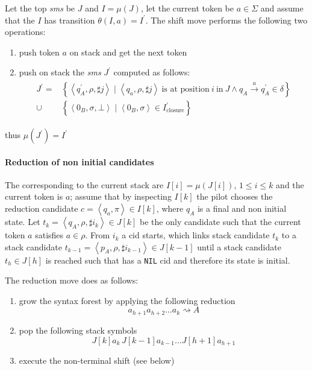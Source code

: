 \documentclass[english]{article}
\begin{document}
Let the top \textit{sms} be \(J\) and \(I = \mu(J)\), let the current token be \(a \in \Sigma\) and assume that the \mstate \(I\) has transition \(\theta(I, a) = I^\prime\). The shift move performs the following two operations:
\begin{enumerate}[label=\arabic*., ref=(\arabic*)]
  \item\label{enum:shift-move-1} push token \(a\) on stack and get the next token
  \item\label{enum:shift-move-2} push on stack the \textit{sms} \(J^\prime\) computed as follows:
  \begin{gather*}
    \begin{aligned}
      J^\prime  = & \left\{ \left\langle q_A^\prime, \rho, \sharp j \right\rangle \mid \left\langle q_a, \rho, \sharp j \right\rangle \ \text{is at position} \ i \ \text{in} \ J \land q_A \xrightarrow{a} q_A^\prime \in \delta \right\} \\
      \cup        & \left\{ \left\langle 0_B, \sigma, \bot \right\rangle \mid \left\langle 0_B, \sigma  \right\rangle \in I_{\text{closure}}^\prime \right\}
    \end{aligned}
  \end{gather*}
\end{enumerate}
thus \(\mu(J^\prime) = I^\prime\)

\paragraph*{Reduction of non initial candidates}

The \mstates corresponding to the current stack are \(I[i] = \mu\left( J[i] \right), \, 1 \leq i \leq k\) and the current token is \(a\);
assume that by inspecting \(I[k]\) the pilot chooses the reduction candidate \(c = \left\langle q_a, \pi \right\rangle \in I[k]\), where \(q_A\) is a final and non initial state.
Let \(t_k = \left\langle q_A, \rho, \sharp i_k \right\rangle \in J[k]\) be the only candidate such that the current token \(a\) satisfies \(a \in \rho\).
From \(i_k\) a cid starts, which links stack candidate \(t_k\) to a stack candidate \(t_{k-1} = \left\langle p_A, \rho, \sharp i_{k-1} \right\rangle \in J[k-1]\) until a stack candidate \(t_h \in J[h]\) is reached such that has a \texttt{NIL} cid and therefore its state is initial.

The reduction move does as follows:

\begin{enumerate}
  \item grow the syntax forest by applying the following reduction
        \[ a_{h+1} a_{h+2} \ldots a_k \rightsquigarrow A \]
  \item pop the following stack symbols
        \[ J[k] a_k \, J[k-1] a_{k-1} \ldots J[h+1] a_{h+1} \]
  \item execute the non-terminal shift (see below)
\end{enumerate}
\end{document}
